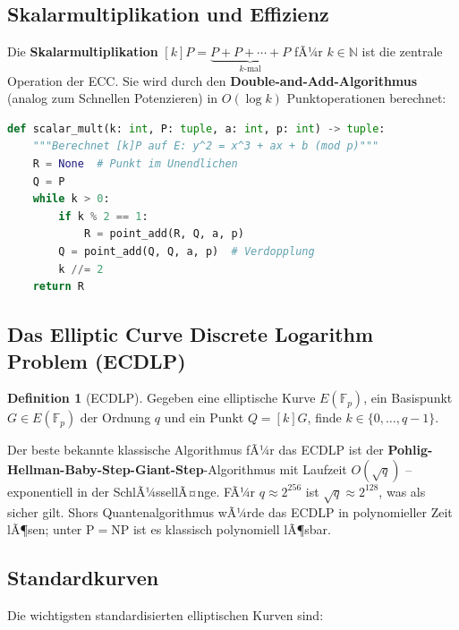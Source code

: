 ﻿\documentclass[a4paper,12pt]{scrreprt}
\theoremstyle{definition}
\newtheorem{definition}{Definition}[section]
\begin{document}
\subsection{Skalarmultiplikation und Effizienz}

Die \textbf{Skalarmultiplikation} $[k]P = \underbrace{P + P + \cdots + P}_{k\text{-mal}}$ fÃ¼r $k \in \mathbb{N}$ ist die zentrale Operation der ECC. Sie wird durch den \textbf{Double-and-Add-Algorithmus} (analog zum Schnellen Potenzieren) in $O(\log k)$ Punktoperationen berechnet:

\begin{lstlisting}[language=Python, caption=Skalarmultiplikation auf elliptischen Kurven]
def scalar_mult(k: int, P: tuple, a: int, p: int) -> tuple:
    """Berechnet [k]P auf E: y^2 = x^3 + ax + b (mod p)"""
    R = None  # Punkt im Unendlichen
    Q = P
    while k > 0:
        if k % 2 == 1:
            R = point_add(R, Q, a, p)
        Q = point_add(Q, Q, a, p)  # Verdopplung
        k //= 2
    return R
\end{lstlisting}

\subsection{Das Elliptic Curve Discrete Logarithm Problem (ECDLP)}

\begin{definition}[ECDLP]
Gegeben eine elliptische Kurve $E(\mathbb{F}_p)$, ein Basispunkt $G \in E(\mathbb{F}_p)$ der Ordnung $q$ und ein Punkt $Q = [k]G$, finde $k \in \{0,\ldots,q-1\}$.
\end{definition}

Der beste bekannte klassische Algorithmus fÃ¼r das ECDLP ist der \textbf{Pohlig-Hellman-Baby-Step-Giant-Step}-Algorithmus mit Laufzeit $O(\sqrt{q})$ -- exponentiell in der SchlÃ¼ssellÃ¤nge. FÃ¼r $q \approx 2^{256}$ ist $\sqrt{q} \approx 2^{128}$, was als sicher gilt. Shors Quantenalgorithmus \cite{Sho94} wÃ¼rde das ECDLP in polynomieller Zeit lÃ¶sen; unter $\mathrm{P} = \mathrm{NP}$ \cite{Epp26a} ist es klassisch polynomiell lÃ¶sbar.

\subsection{Standardkurven}

Die wichtigsten standardisierten elliptischen Kurven sind:
\end{document}
